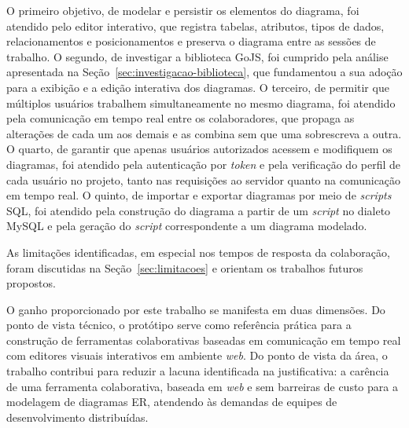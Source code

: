 O primeiro objetivo, de modelar e persistir os elementos do diagrama, foi atendido pelo editor interativo, que registra tabelas, atributos, tipos de dados, relacionamentos e posicionamentos e preserva o diagrama entre as sessões de trabalho. O segundo, de investigar a biblioteca GoJS, foi cumprido pela análise apresentada na Seção~\ref{sec:investigacao-biblioteca}, que fundamentou a sua adoção para a exibição e a edição interativa dos diagramas. O terceiro, de permitir que múltiplos usuários trabalhem simultaneamente no mesmo diagrama, foi atendido pela comunicação em tempo real entre os colaboradores, que propaga as alterações de cada um aos demais e as combina sem que uma sobrescreva a outra. O quarto, de garantir que apenas usuários autorizados acessem e modifiquem os diagramas, foi atendido pela autenticação por \textit{token} e pela verificação do perfil de cada usuário no projeto, tanto nas requisições ao servidor quanto na comunicação em tempo real. O quinto, de importar e exportar diagramas por meio de \textit{scripts} SQL, foi atendido pela construção do diagrama a partir de um \textit{script} no dialeto MySQL e pela geração do \textit{script} correspondente a um diagrama modelado.

As limitações identificadas, em especial nos tempos de resposta da colaboração, foram discutidas na Seção~\ref{sec:limitacoes} e orientam os trabalhos futuros propostos.

O ganho proporcionado por este trabalho se manifesta em duas dimensões. Do ponto de vista técnico, o protótipo serve como referência prática para a construção de ferramentas colaborativas baseadas em comunicação em tempo real com editores visuais interativos em ambiente \textit{web}. Do ponto de vista da área, o trabalho contribui para reduzir a lacuna identificada na justificativa: a carência de uma ferramenta colaborativa, baseada em \textit{web} e sem barreiras de custo para a modelagem de diagramas ER, atendendo às demandas de equipes de desenvolvimento distribuídas.
